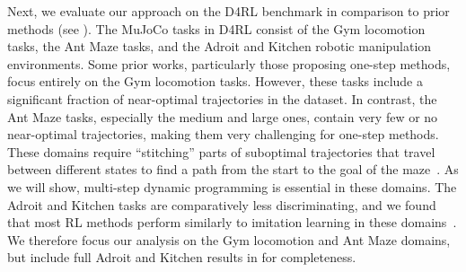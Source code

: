 Next, we evaluate our approach on the D4RL benchmark in comparison to prior methods (see ).
The MuJoCo tasks in D4RL consist of the Gym locomotion tasks, the Ant Maze tasks, and the Adroit and Kitchen robotic manipulation environments. Some prior works, particularly those proposing one-step methods, focus entirely on the Gym locomotion tasks. However, these tasks include a significant fraction of near-optimal trajectories in the dataset. In contrast, the Ant Maze tasks, especially the medium and large ones, contain very few or no near-optimal trajectories, making them very challenging for one-step methods. These domains require ``stitching'' parts of suboptimal trajectories that travel between different states to find a path from the start to the goal of the maze~\citep{fu2020d4rl}. As we will show, multi-step dynamic programming is essential in these domains. The Adroit and Kitchen tasks are comparatively less discriminating, and we found that most RL methods perform similarly to imitation learning in these domains~\citep{florence2021implicit}. We therefore focus our analysis on the Gym locomotion and Ant Maze domains, but include full Adroit and Kitchen results in  for completeness.

\vspace{-0.15in}
